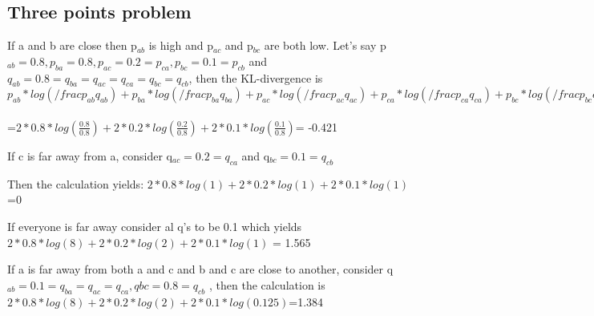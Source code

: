 \documentclass[10pt]{article}
\begin{document}
\subsection{Three points problem}
If a and b are close then p$_{ab}$ is high and p$_{ac}$ and p$_{bc}$ are both low. Let's say p$_{ab}=0.8,p_{ba}=0.8,p_{ac}=0.2=p_{ca},p_{bc}=0.1=p_{cb}$ and $q_{ab}=0.8=q_{ba}=q_{ac}=q_{ca}=q_{bc}=q_{cb}$, then the KL-divergence is $p_{ab}*log(/frac{p_{ab}}{q_{ab}})+p_{ba}*log(/frac{p_{ba}}{q_{ba}})+p_{ac}*log(/frac{p_{ac}}{q_{ac}})+p_{ca}*log(/frac{p_{ca}}{q_{ca}})+p_{bc}*log(/frac{p_{bc}}{q_{bc}})+p_{cb}*log(/frac{p_{cb}}{q_{cb}})$
\\
\\
=$2*0.8*log(\frac{0.8}{0.8})+2*0.2*log(\frac{0.2}{0.8})+2*0.1*log(\frac{0.1}{0.8})$= -0.421


If c is far away from a, consider q$_{ac}=0.2=q_{ca}$ and q$_{bc}=0.1=q_{cb}$

Then the calculation yields:
$2*0.8*log(1)+2*0.2*log(1)+2*0.1*log(1)$
=0

 If everyone is far away consider al q's to be 0.1 which yields
$2*0.8*log(8)+2*0.2*log(2)+2*0.1*log(1)$
=  1.565


If a is far away from both a and c and b and c are close to another, consider
q$_{ab}=0.1=q_{ba}=q_{ac}=q_{ca},q{bc}=0.8=q_{cb}$
, then the calculation is 
$2*0.8*log(8)+2*0.2*log(2)+2*0.1*log(0.125)$=1.384
\end{document}

